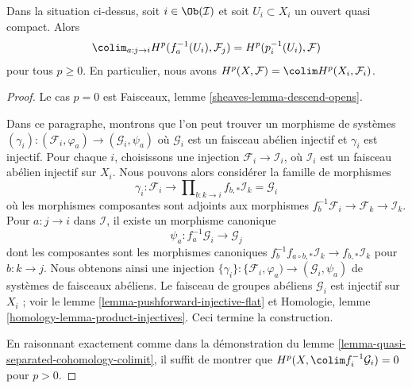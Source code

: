 \begin{lemma}

\label{lemma-colimit}
Dans la situation ci-dessus, soit $i \in \Ob(\mathcal{I})$ et soit $U_i \subset X_i$ un ouvert quasi compact. Alors $$
\colim_{a : j \to i} H^p(f_a^{-1}(U_i), \mathcal{F}_j) =
H^p(p_i^{-1}(U_i), \mathcal{F})
$$ pour tous $p \geq 0$. En particulier, nous avons $H^p(X, \mathcal{F}) = \colim H^p(X_i, \mathcal{F}_i)$.
\end{lemma}

\begin{proof}
Le cas $p = 0$ est Faisceaux, lemme \ref{sheaves-lemma-descend-opens}.

\medskip\noindent

Dans ce paragraphe, montrons que l'on peut trouver un morphisme de systèmes
$(\gamma_i) : (\mathcal{F}_i, \varphi_a) \to (\mathcal{G}_i, \psi_a)$
où $\mathcal{G}_i$ est un faisceau abélien injectif et $\gamma_i$ est injectif. Pour chaque $i$, choisissons une injection $\mathcal{F}_i \to \mathcal{I}_i$,
où $\mathcal{I}_i$ est un faisceau abélien injectif sur $X_i$. Nous pouvons alors considérer la famille de morphismes
$$
\gamma_i :
\mathcal{F}_i
\longrightarrow
\prod\nolimits_{b : k \to i} f_{b, *}\mathcal{I}_k = \mathcal{G}_i
$$
où les morphismes composantes sont adjoints aux morphismes
$f_b^{-1}\mathcal{F}_i \to \mathcal{F}_k \to \mathcal{I}_k$. Pour $a : j \to i$ dans $\mathcal{I}$, il existe un morphisme canonique
$$
\psi_a : f_a^{-1}\mathcal{G}_i \to \mathcal{G}_j
$$
dont les composantes sont les morphismes canoniques
$f_b^{-1}f_{a \circ b, *}\mathcal{I}_k \to f_{b, *}\mathcal{I}_k$
pour $b : k \to j$. Nous obtenons ainsi une injection
$\{\gamma_i\} : \{\mathcal{F}_i, \varphi_a) \to (\mathcal{G}_i, \psi_a)$
de systèmes de faisceaux abéliens. Le faisceau de groupes abéliens $\mathcal{G}_i$ est injectif sur $X_i$ ; voir le lemme \ref{lemma-pushforward-injective-flat} et Homologie, lemme \ref{homology-lemma-product-injectives}. Ceci termine la construction.

\medskip\noindent
En raisonnant exactement comme dans la démonstration du lemme \ref{lemma-quasi-separated-cohomology-colimit}, il suffit de montrer que $H^p(X, \colim f_i^{-1}\mathcal{G}_i) = 0$ pour $p > 0$.

\medskip\noindent


\end{proof}

